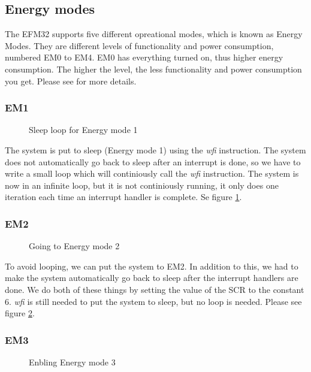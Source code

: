 	\subsection{Energy modes}
	The EFM32 supports five different opreational modes, which is known as Energy Modes. They are different levels of functionality and power consumption, numbered EM0 to EM4. EM0 has everything turned on, thus higher energy consumption. The higher the level, the less functionality and power consumption you get. Please see \cite[p. 2]{energy_optimization_application_note} for more details. 

	\subsubsection{EM1}
	\label{subsubsection:em1}

	\begin{figure}[t]
		
		\caption{Sleep loop for Energy mode 1}
		\label{code:em1}
	\end{figure}
	The system is put to sleep (Energy mode 1) using the \emph{wfi} instruction. The system does not automatically go back to sleep after an interrupt is done, so we have to write a small loop which will continiously call the \emph{wfi} instruction. The system is now in an infinite loop, but it is not continiously running, it only does one iteration each time an interrupt handler is complete. Se figure \ref{code:em1}.

	\subsubsection{EM2}
	\label{subsubsection:em2}
	
	\begin{figure}[t]
		
		\caption{Going to Energy mode 2}
		\label{code:wfi_scr}
	\end{figure}

	To avoid looping, we can put the system to EM2. In addition to this, we had to make the system automatically go back to sleep after the interrupt handlers are done. We do both of these things by setting the value of the SCR to the constant $6$. \emph{wfi} is still needed to put the system to sleep, but no loop is needed. Please see figure \ref{code:wfi_scr}.

		\subsubsection{EM3}
		\label{subsubsection:em3}	
		\begin{figure}[t]
			
			\caption{Enbling Energy mode 3}
			\label{code:em3}
		\end{figure}

